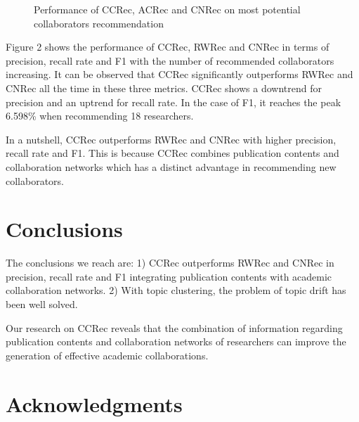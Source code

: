 \documentclass{acm_proc_article-sp}
\begin{document}
\begin{figure}
\centering
{}
\caption{Performance of CCRec, ACRec and CNRec on most potential collaborators recommendation}
\label{fig:3}       %
\end{figure}

Figure 2 shows the performance of CCRec, RWRec and CNRec in terms of precision, recall rate and F1 with the number of recommended collaborators increasing. It can be observed that CCRec significantly outperforms RWRec and CNRec all the time in these three metrics. CCRec shows a downtrend for precision and an uptrend for recall rate. In the case of F1, it reaches the peak 6.598\% when recommending 18 researchers.

In a nutshell, CCRec outperforms RWRec and CNRec with higher precision, recall rate and F1. This is because CCRec combines publication contents and collaboration networks which has a distinct advantage in recommending new collaborators.

\section{Conclusions}
The conclusions we reach are: 1) CCRec outperforms RWRec and CNRec in precision, recall rate and F1 integrating publication contents with academic collaboration networks. 2) With topic clustering, the problem of topic drift has been well solved.

Our research on CCRec reveals that the combination of information regarding publication contents and collaboration networks of researchers can improve the generation of effective academic collaborations.

\section{Acknowledgments}



\balancecolumns
\end{document}
